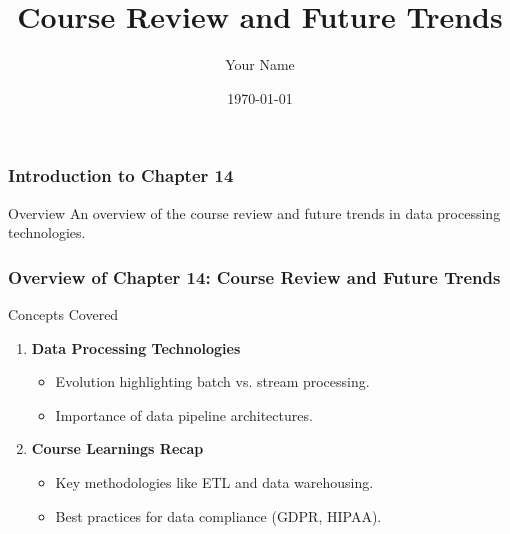 \documentclass{beamer}
\title{Course Review and Future Trends}
\author{Your Name}
\institute{Your Institution}
\date{\today}
\begin{document}
\frame{\titlepage}

\begin{frame}[fragile]
    \frametitle{Introduction to Chapter 14}
    \begin{block}{Overview}
        An overview of the course review and future trends in data processing technologies.
    \end{block}
\end{frame}

\begin{frame}[fragile]
    \frametitle{Overview of Chapter 14: Course Review and Future Trends}
    \begin{block}{Concepts Covered}
        \begin{enumerate}
            \item {\bf Data Processing Technologies}
                \begin{itemize}
                    \item Evolution highlighting batch vs. stream processing.
                    \item Importance of data pipeline architectures.
                \end{itemize}
            \item {\bf Course Learnings Recap}
                \begin{itemize}
                    \item Key methodologies like ETL and data warehousing.
                    \item Best practices for data compliance (GDPR, HIPAA).
                \end{itemize}
        \end{enumerate}
    \end{block}
\end{frame}
\end{document}

